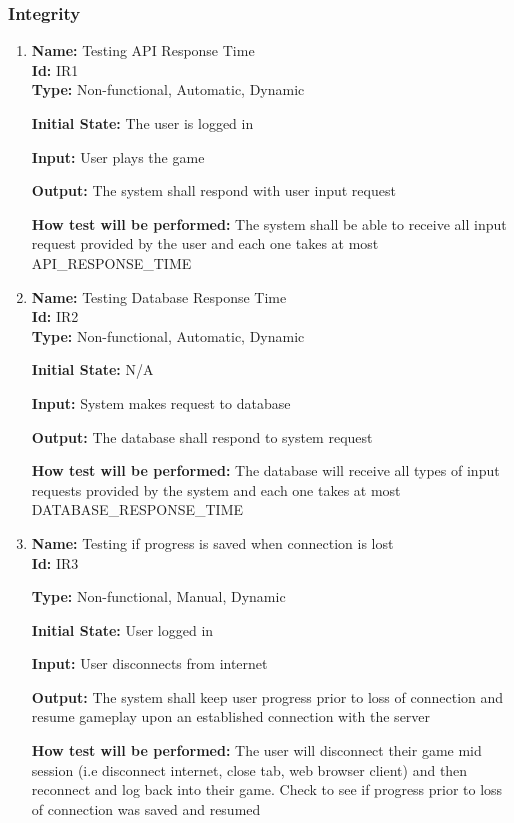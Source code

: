 \documentclass[12pt, titlepage]{article}
\begin{document}
\subsubsection{Integrity}
\begin{enumerate}
    \item{\textbf{Name:} Testing API Response Time \\} \label{Test-IR1}
    \textbf{Id:} IR1 \\
    \textbf{Type:} Non-functional, Automatic, Dynamic
    					
    \textbf{Initial State:} The user is logged in
    					
    \textbf{Input:} User plays the game
    					
    \textbf{Output:} The system shall respond with user input request
    					
    \textbf{How test will be performed:} The system shall be able to receive all input request provided by the user and each one takes at most API\_RESPONSE\_TIME
    
    \item{\textbf{Name:} Testing Database Response Time \\} \label{Test-IR2}
    \textbf{Id:} IR2 \\
    
    \textbf{Type:} Non-functional, Automatic, Dynamic
    					
    \textbf{Initial State:} N/A
    					
    \textbf{Input:} System makes request to database
    					
    \textbf{Output:} The database shall respond to system request
    					
    \textbf{How test will be performed:} The database will receive all types of input requests provided by the system and each one takes at most DATABASE\_RESPONSE\_TIME
    
    \item{\textbf{Name:} Testing if progress is saved when connection is lost \\} \label{Test-IR3}
    \textbf{Id:} IR3 
    
    \textbf{Type:} Non-functional, Manual, Dynamic
    					
    \textbf{Initial State:} User logged in
    					
    \textbf{Input:} User disconnects from internet
    					
    \textbf{Output:} The system shall keep user progress prior to loss of connection and resume gameplay upon an established connection with the server
    					
    \textbf{How test will be performed:} The user will disconnect their game mid session (i.e disconnect internet, close tab, web browser client) and then reconnect and log back into their game. Check to see if progress prior to loss of connection was saved and resumed
\end{enumerate}
\end{document}
